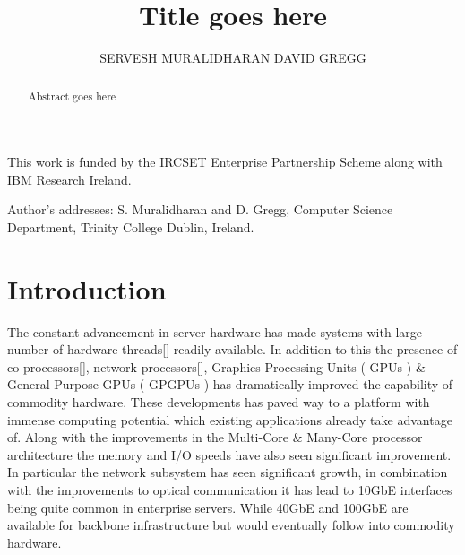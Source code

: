 \documentclass[prodmode,acmtaco]{acmsmall}
\begin{document}

\title{Title goes here}
\author{
SERVESH MURALIDHARAN
DAVID GREGG
}

\begin{abstract}

Abstract goes here

\end{abstract}



\keywords{}


\begin{bottomstuff}
This work is funded by the IRCSET Enterprise Partnership Scheme along with IBM Research Ireland.

Author's addresses: S. Muralidharan {and} D. Gregg, Computer Science Department,
Trinity College Dublin, Ireland.
\end{bottomstuff}

\maketitle

\section{Introduction}

The constant advancement in server hardware has made systems with large number of hardware threads[] readily available. In addition to this the presence of co-processors[], network processors[], Graphics Processing Units ( GPUs ) \& General Purpose GPUs ( GPGPUs ) has dramatically improved the capability of commodity hardware. These developments has paved way to a platform with immense computing potential which existing applications already take advantage of. Along with the improvements in the Multi-Core \& Many-Core processor architecture the memory and I/O speeds have also seen significant improvement. In particular the network subsystem has seen significant growth, in combination with the improvements to optical communication it has lead to 10GbE interfaces being quite common in enterprise servers. While 40GbE and 100GbE are available for backbone infrastructure but would eventually follow into commodity hardware. 
\end{document}

